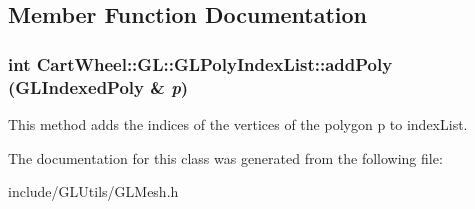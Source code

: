 \subsection{Member Function Documentation}
\hypertarget{classCartWheel_1_1GL_1_1GLPolyIndexList_ae9760cd87383177864175e4c6b7b7d6c}{
\subsubsection[{addPoly}]{\setlength{\rightskip}{0pt plus 5cm}int CartWheel::GL::GLPolyIndexList::addPoly ({\bf GLIndexedPoly} \& {\em p})}}
\label{classCartWheel_1_1GL_1_1GLPolyIndexList_ae9760cd87383177864175e4c6b7b7d6c}
This method adds the indices of the vertices of the polygon p to indexList. 

The documentation for this class was generated from the following file:\begin{DoxyCompactItemize}
\item 
include/GLUtils/GLMesh.h\end{DoxyCompactItemize}
